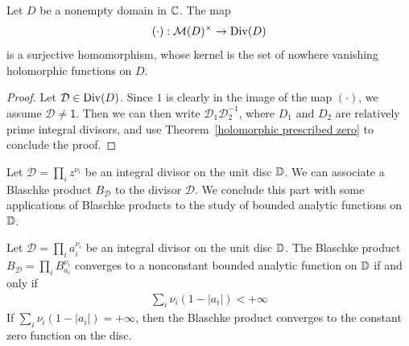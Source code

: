 \begin{theorem}
Let $D$ be a nonempty domain in $\mathbb{C}$. The map  
\[(\cdot):\mathcal{M}(D)^{\times}\to\mathrm{Div}(D)\]
is a surjective homomorphism, whose kernel is the set of nowhere vanishing
holomorphic functions on $D$.
\end{theorem}
\begin{proof}
Let $\mathcal{D}\in\mathrm{Div}(D)$. Since $\mathrm{1}$ is clearly in the image of the map $(\cdot)$, we assume $\mathcal{D}\neq\mathsf{1}$. Then we can then write $\mathcal{D}_1\mathcal{D}_2^{-1}$, where $D_1$ and $D_2$ are relatively prime integral divisors, and use Theorem~\ref{holomorphic prescribed zero} to conclude the proof.
\end{proof}
Let $\mathcal{D}=\prod_iz^{\nu_i}$ be an integral divisor on the unit disc $\mathbb{D}$. We can associate a Blaschke product $B_{\mathcal{D}}$ to the divisor $\mathcal{D}$. We conclude this part with some applications of Blaschke products to the study of bounded analytic functions on $\mathbb{D}$.
\begin{theorem}\label{Blaschke product infinite converge nonzero iff}
Let $\mathcal{D}=\prod_ia_i^{\nu_i}$ be an integral divisor on the unit disc $\mathbb{D}$. The Blaschke product $B_{\mathcal{D}}=\prod_iB_{a_i}^{\nu_i}$ converges to a nonconstant bounded analytic function on $\mathbb{D}$ if and only if
\begin{align}\label{Blaschke product infinite converge nonzero iff-1}
\sum_{i}\nu_i(1-|a_i|)<+\infty
\end{align}
If $\sum_i\nu_i(1-|a_i|)=+\infty$, then the Blaschke product converges to the constant zero function on the disc.
\end{theorem}
